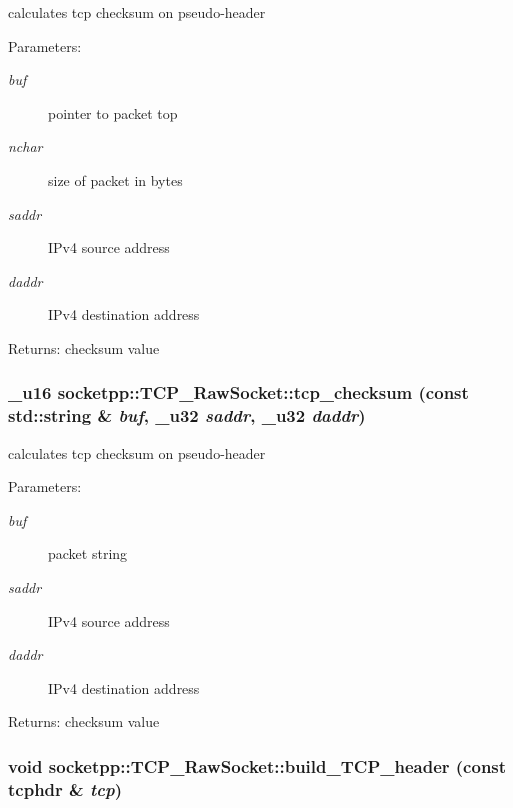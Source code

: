 calculates tcp checksum on pseudo-header 

\begin{Desc}
\item[Parameters:]
\begin{description}
\item[{\em buf}]pointer to packet top \item[{\em nchar}]size of packet in bytes \item[{\em saddr}]IPv4 source address \item[{\em daddr}]IPv4 destination address \end{description}
\end{Desc}
\begin{Desc}
\item[Returns:]checksum value \end{Desc}
\hypertarget{classsocketpp_1_1TCP__RawSocket_59a27cc258c1007b2f7e68428fd50f80}{
\subsubsection{\setlength{\rightskip}{0pt plus 5cm}\_\-u16 socketpp::TCP\_\-RawSocket::tcp\_\-checksum (const std::string \& {\em buf}, \/  \_\-u32 {\em saddr}, \/  \_\-u32 {\em daddr})}}
\label{classsocketpp_1_1TCP__RawSocket_59a27cc258c1007b2f7e68428fd50f80}


calculates tcp checksum on pseudo-header 

\begin{Desc}
\item[Parameters:]
\begin{description}
\item[{\em buf}]packet string \item[{\em saddr}]IPv4 source address \item[{\em daddr}]IPv4 destination address \end{description}
\end{Desc}
\begin{Desc}
\item[Returns:]checksum value \end{Desc}
\hypertarget{classsocketpp_1_1TCP__RawSocket_8c35edfc4d8c2fbccf0fe13485dd2ef1}{
\subsubsection{\setlength{\rightskip}{0pt plus 5cm}void socketpp::TCP\_\-RawSocket::build\_\-TCP\_\-header (const tcphdr \& {\em tcp})}}
\label{classsocketpp_1_1TCP__RawSocket_8c35edfc4d8c2fbccf0fe13485dd2ef1}


